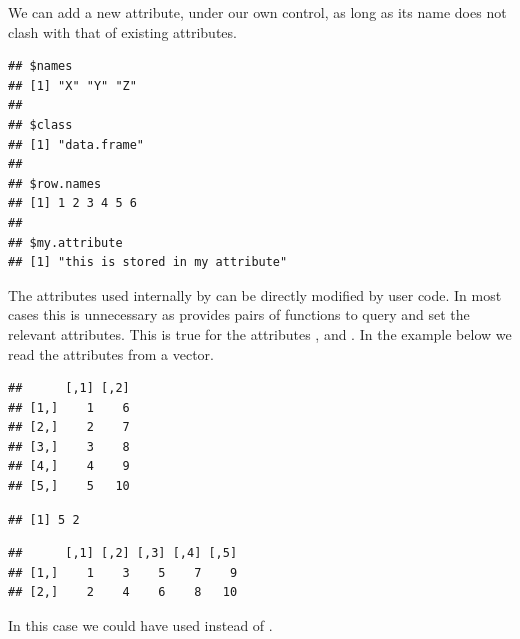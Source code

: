 \documentclass[krantz2]{krantz}\usepackage{knitr}
\begin{document}
We can add a new attribute, under our own control, as long as its name does not clash with that of existing attributes.

\begin{knitrout}\footnotesize
{}\color{fgcolor}\begin{kframe}
\begin{alltt}
 \hlstd{)} \hlkwb{<-} 
\end{alltt}
\begin{verbatim}
## $names
## [1] "X" "Y" "Z"
## 
## $class
## [1] "data.frame"
## 
## $row.names
## [1] 1 2 3 4 5 6
## 
## $my.attribute
## [1] "this is stored in my attribute"
\end{verbatim}
\end{kframe}
\end{knitrout}

\begin{explainbox}
The attributes used internally by \Rlang can be directly modified by user code. In most cases this is unnecessary as \Rlang provides pairs of functions to query and set the relevant attributes. This is true for the attributes ,  and . In the example below we read the attributes from a vector.

\begin{knitrout}\footnotesize
{}\color{fgcolor}\begin{kframe}
\begin{alltt}
 \hlkwb{<-} \hlstd{(}\hlopt{:}\hlstd{,}  \hlstd{=} \hlstd{)}
\end{alltt}
\begin{verbatim}
##      [,1] [,2]
## [1,]    1    6
## [2,]    2    7
## [3,]    3    8
## [4,]    4    9
## [5,]    5   10
\end{verbatim}
\begin{alltt}
 \hlstd{)}
\end{alltt}
\begin{verbatim}
## [1] 5 2
\end{verbatim}
\begin{alltt}
 \hlstd{)} \hlkwb{<-} \hlstd{(}\hlstd{,} \hlstd{)}
\end{alltt}
\begin{verbatim}
##      [,1] [,2] [,3] [,4] [,5]
## [1,]    1    3    5    7    9
## [2,]    2    4    6    8   10
\end{verbatim}
\end{kframe}
\end{knitrout}

In this case we could have used  instead of .
\end{explainbox}
\end{document}
